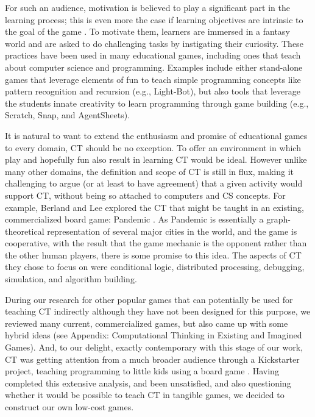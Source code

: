 \documentclass{acm_proc_article-sp}
\begin{document}
For such an audience, motivation is believed to play a significant part in the learning process; this is even more the case if learning objectives are intrinsic to the goal of the game \cite{malone1987making}. To motivate them, learners are immersed in a fantasy world and are asked to do challenging tasks by instigating their curiosity. These practices have been used in many educational games, including ones that teach about computer science and programming. Examples include either stand-alone games that leverage elements of fun to teach simple programming concepts like pattern recognition and recursion (e.g., Light-Bot), but also tools that leverage the students innate creativity to learn programming through game building (e.g., Scratch, Snap, and AgentSheets).

It is natural to want to extend the enthusiasm and promise of educational games to every domain, CT should be no exception. To offer an environment in which play and hopefully fun also result in learning CT would be ideal. However unlike many other domains, the definition and scope of CT is still in flux, making it challenging to argue (or at least to have agreement) that a given activity would support CT, without being so attached to computers and CS concepts. For example, Berland and Lee explored the CT that might be taught in an existing, commercialized board game: Pandemic \cite{berland2011collaborative}. As Pandemic is essentially a graph-theoretical representation of several major cities in the world, and the game is cooperative, with the result that the game mechanic is the opponent rather than the other human players, there is some promise to this idea. The aspects of CT they chose to focus on were conditional logic, distributed processing, debugging, simulation, and algorithm building. 

During our research for other popular games that can potentially be used for teaching CT indirectly although they have not been designed for this purpose, we reviewed many current, commercialized games, but also came up with some hybrid ideas (see Appendix: Computational Thinking in Existing and Imagined Games). And, to our delight, exactly contemporary with this stage of our work, CT was getting attention from a much broader audience through a Kickstarter project, teaching programming to little kids using a board game \cite{robotturtles}. Having completed this extensive analysis, and been unsatisfied, and also questioning whether it would be possible to teach CT in tangible games, we decided to construct our own low-cost games.
\end{document}
